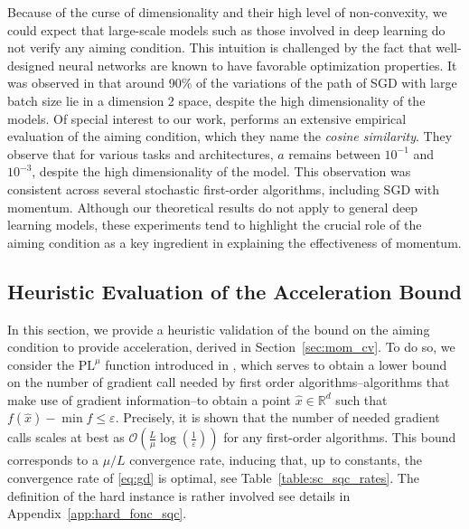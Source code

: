 \documentclass{article}
\def\R{{\mathbb{R}}}
\def\pl{{\text{PL}^\mu}}
\newcommand{\bigO}{\mathcal{O}}
\theoremstyle{plain}
\theoremstyle{definition}
\theoremstyle{remark}
\begin{document}
Because of the curse of dimensionality and their high level of non-convexity, we could expect that large-scale models such as those involved in deep learning do not verify any aiming condition. This intuition is challenged by the fact that well-designed neural networks are known to have favorable optimization properties. It was observed in \cite{li2018visualizing} that around 90$\%$ of the variations of the path of SGD with large batch size lie in a dimension 2 space, despite the high dimensionality of the models. Of special interest to our work, \cite{guille2024no} performs an extensive empirical evaluation of the aiming condition, which they name the \textit{cosine similarity}. They observe that for various tasks and architectures, $a$ remains between $10^{-1}$ and $10^{-3}$, despite the high dimensionality of the model. This observation was consistent across several stochastic first-order algorithms, including SGD with momentum. Although our theoretical results do not apply to general deep learning models, these experiments tend to highlight the crucial role of the aiming condition as a key ingredient in explaining the effectiveness of momentum.
\subsection{Heuristic Evaluation of the Acceleration Bound}\label{app:heuristic}
In this section, we provide a heuristic validation of the bound on the aiming condition to provide acceleration, derived in Section~\ref{sec:mom_cv}. To do so, we consider the $\pl$ function introduced in \cite{PLlowerbound}, which serves to obtain a lower bound on the number of gradient call needed by first order algorithms--algorithms that make use of gradient information--to obtain a point $\hat x \in \R^d$ such that $f(\hat x)-\min f \le \varepsilon$. Precisely, it is shown that the number of needed gradient calls scales at best as $\bigO(\frac{L}{\mu}\log(\frac{1}{\varepsilon}))$ for any first-order algorithms. This bound corresponds to a $\mu/L$ convergence rate, inducing that, up to constants, the convergence rate of \eqref{eq:gd} is optimal, see Table~\ref{table:sc_sqc_rates}. The definition of the hard instance is rather involved see details in Appendix~\ref{app:hard_fonc_sqc}. 
\end{document}
